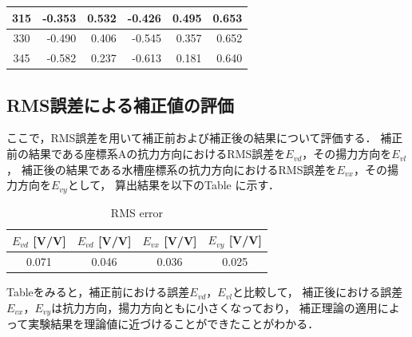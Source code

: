 \begin{table}[htbp]
\begin{center}
\begin{tabular}{|p{20mm}|p{20mm}|p{20mm}|p{20mm}|p{20mm}|p{20mm}|}
            \multicolumn{1}{|c|}{315}                     & \multicolumn{1}{|r|}{-0.353}                        & \multicolumn{1}{|r|}{0.532}                   & \multicolumn{1}{|r|}{-0.426}                    & \multicolumn{1}{|r|}{0.495}                   & \multicolumn{1}{|r|}{0.653}                         \\ \hline
            \multicolumn{1}{|c|}{330}                     & \multicolumn{1}{|r|}{-0.490}                        & \multicolumn{1}{|r|}{0.406}                   & \multicolumn{1}{|r|}{-0.545}                    & \multicolumn{1}{|r|}{0.357}                   & \multicolumn{1}{|r|}{0.652}                         \\ \hline
            \multicolumn{1}{|c|}{345}                     & \multicolumn{1}{|r|}{-0.582}                        & \multicolumn{1}{|r|}{0.237}                   & \multicolumn{1}{|r|}{-0.613}                    & \multicolumn{1}{|r|}{0.181}                   & \multicolumn{1}{|r|}{0.640}                         \\ \hline
        \end{tabular}
    \end{center}
\end{table}

\newpage

\subsection{RMS誤差による補正値の評価}

ここで，RMS誤差を用いて補正前および補正後の結果について評価する．
補正前の結果である座標系Aの抗力方向におけるRMS誤差を$E_{vd}$，その揚力方向を$E_{vl}$，
補正後の結果である水槽座標系の抗力方向におけるRMS誤差を$E_{vx}$，その揚力方向を$E_{vy}$として，
算出結果を以下のTable に示す．

\begin{table}[htbp]
  \begin{center}
      \caption{RMS error}
      \begin{tabular}{|p{20mm}|p{20mm}p{20mm}|p{20mm}|}
          \hline
          \multicolumn{1}{|c|}{$E_{vd}$ [V/V]} & \multicolumn{1}{|c|}{$E_{vd}$ [V/V]} & \multicolumn{1}{|c|}{$E_{vx}$ [V/V]} & \multicolumn{1}{|c|}{$E_{vy}$ [V/V]} \\ \hline
          \multicolumn{1}{|c|}{0.071}          & \multicolumn{1}{|c|}{0.046}          & \multicolumn{1}{|c|}{0.036}          & \multicolumn{1}{|c|}{0.025}            \\ \hline
      \end{tabular}
  \end{center}
\end{table}

Tableをみると，補正前における誤差$E_{vd}$，$E_{vl}$と比較して，
補正後における誤差$E_{vx}$，$E_{vy}$は抗力方向，揚力方向ともに小さくなっており，
補正理論の適用によって実験結果を理論値に近づけることができたことがわかる．
